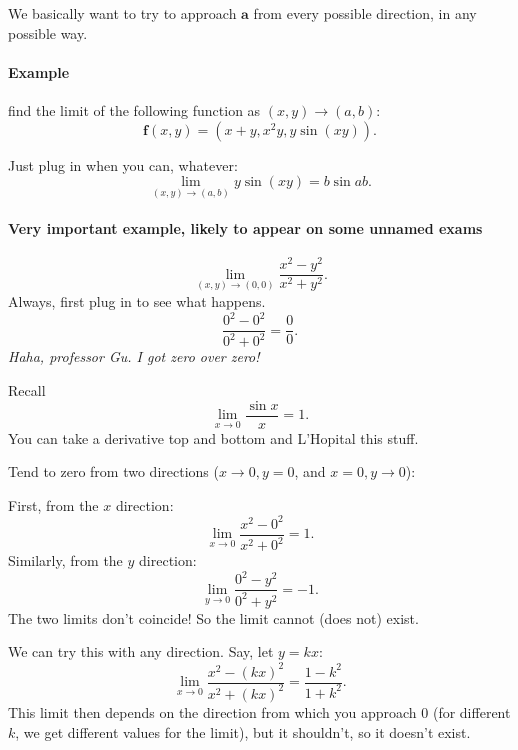 \documentclass[11pt]{article}
\renewcommand{\vec}[1]{\mathbf{#1}}
\begin{document}
We basically want to try to approach \(\vec a\) from every possible direction, in any possible way.

\paragraph{Example} find the limit of the following function as \((x, y) \to (a, b)\):
\[
    \vec f(x, y) = (x+y, x^2 y, y \sin (xy)).
\]

Just plug in when you can, whatever:
\[
    \lim_{(x, y) \to (a, b)} y \sin (xy) = b \sin ab.
\]

\paragraph{Very important example, likely to appear on some unnamed exams}
\[
    \lim_{(x, y) \to (0, 0)} \frac{x^2 - y^2}{x^2 + y^2}.
\]
Always, first plug in to see what happens. 
\[
    \frac{0^2 - 0^2}{0^2 + 0^2} = \frac{0}{0}.
\]
\emph{Haha, professor Gu. I got zero over zero!}

\begin{framed}
Recall
\[
    \lim_{x \to 0} \frac{\sin x}{x} = 1.
\]
You can take a derivative top and bottom and L'Hopital this stuff.
\end{framed}

Tend to zero from two directions (\(x \to 0, y = 0\), and \(x = 0, y \to 0\)):
\begin{center}
\end{center}

First, from the \(x\) direction:
\[
    \lim_{x \to 0} \frac{x^2 - 0^2}{x^2 + 0^2} = 1.
\]
Similarly, from the \(y\) direction:
\[
    \lim_{y \to 0} \frac{0^2 - y^2}{0^2 + y^2} = -1.
\]
The two limits don't coincide! So the limit cannot (does not) exist.

We can try this with any direction. Say, let \(y = kx\):
\[
    \lim_{x \to 0} \frac{x^2 - (kx)^2}{x^2 + (kx)^2} = \frac{1-k^2}{1+k^2}.
\]
This limit then depends on the direction from which you approach \(0\) (for different \(k\), we get different values for the limit), but it shouldn't, so it doesn't exist.
\end{document}
